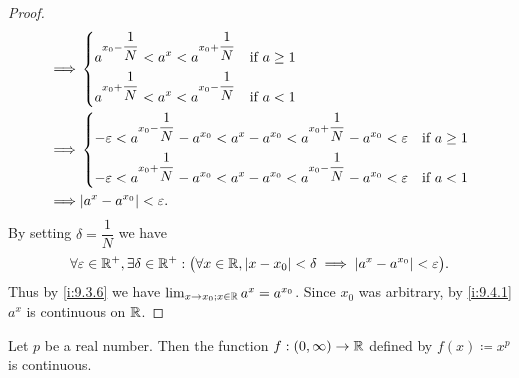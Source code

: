 \begin{proof}
\begin{align*}
    \implies & \begin{dcases}
                 a^{x_0 - \dfrac{1}{N}} < a^{x} < a^{x_0 + \dfrac{1}{N}} & \text{if } a \geq 1 \\
                 a^{x_0 + \dfrac{1}{N}} < a^{x} < a^{x_0 - \dfrac{1}{N}} & \text{if } a < 1
               \end{dcases}                                                          \\
    \implies & \begin{dcases}
                 -\varepsilon < a^{x_0 - \dfrac{1}{N}} - a^{x_0} < a^x - a^{x_0} < a^{x_0 + \dfrac{1}{N}} - a^{x_0} < \varepsilon & \text{if } a \geq 1 \\
                 -\varepsilon < a^{x_0 + \dfrac{1}{N}} - a^{x_0} < a^x - a^{x_0} < a^{x_0 - \dfrac{1}{N}} - a^{x_0} < \varepsilon & \text{if } a < 1
               \end{dcases} \\
    \implies & \abs{a^x - a^{x_0}} < \varepsilon.
  \end{align*}
  By setting \(\delta = \dfrac{1}{N}\) we have
  \[
    \forall \varepsilon \in \mathbb{R}^+, \exists \delta \in \mathbb{R}^+ : \big(\forall x \in \mathbb{R}, \left\lvert x - x_0\right\rvert < \delta \implies \left\lvert a^x - a^{x_0}\right\rvert < \varepsilon\big).
  \]
  Thus by \cref{i:9.3.6} we have \(\lim_{x \to x_0 ; x \in \mathbb{R}} a^x = a^{x_0}\).
  Since \(x_0\) was arbitrary, by \cref{i:9.4.1} \(a^x\) is continuous on \(\mathbb{R}\).
\end{proof}

\begin{prop}\label{i:9.4.11}
  Let \(p\) be a real number.
  Then the function \(f : (0, \infty) \to \mathbb{R}\) defined by \(f(x) \coloneqq x^p\) is continuous.
\end{prop}


